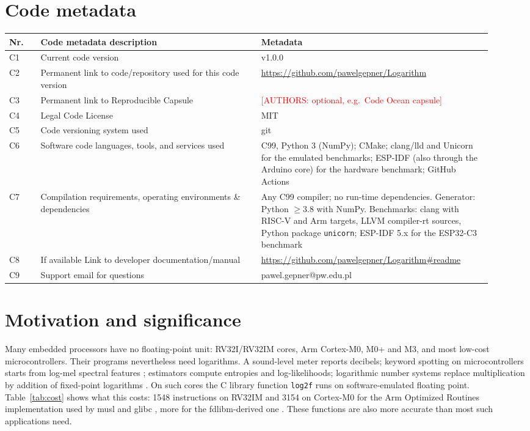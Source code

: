 \documentclass[preprint,12pt]{elsarticle}
\newcommand{\authors}[1]{\textcolor{red}{[AUTHORS: #1]}}
\begin{document}
\section*{Code metadata}
{\small
\begin{tabular}{p{0.06\linewidth}p{0.42\linewidth}p{0.44\linewidth}}
\toprule
Nr. & Code metadata description & Metadata \\
\midrule
C1 & Current code version & v1.0.0 \\
C2 & Permanent link to code/repository used for this code version & \url{https://github.com/pawelgepner/Logarithm} \\
C3 & Permanent link to Reproducible Capsule & \authors{optional, e.g.\ Code Ocean capsule} \\
C4 & Legal Code License & MIT \\
C5 & Code versioning system used & git \\
C6 & Software code languages, tools, and services used & C99, Python 3 (NumPy); CMake; clang/lld and Unicorn for the emulated benchmarks; ESP-IDF (also through the Arduino core) for the hardware benchmark; GitHub Actions \\
C7 & Compilation requirements, operating environments \& dependencies & Any C99 compiler; no run-time dependencies. Generator: Python $\ge$3.8 with NumPy. Benchmarks: clang with RISC-V and Arm targets, LLVM compiler-rt sources, Python package \texttt{unicorn}; ESP-IDF 5.x for the ESP32-C3 benchmark \\
C8 & If available Link to developer documentation/manual & \url{https://github.com/pawelgepner/Logarithm\#readme} \\
C9 & Support email for questions & pawel.gepner@pw.edu.pl \\
\bottomrule
\end{tabular}}

\section{Motivation and significance}

Many embedded processors have no floating-point unit: RV32I/RV32IM cores,
Arm Cortex-M0, M0+ and M3, and most low-cost microcontrollers. Their
programs nevertheless need logarithms. A sound-level meter reports decibels;
keyword spotting on microcontrollers starts from log-mel spectral features
\cite{zhang2017helloedge}; estimators compute entropies and log-likelihoods;
logarithmic number systems replace multiplication by addition of
fixed-point logarithms \cite{coleman2000}. On such cores the C library
function \texttt{log2f} runs on software-emulated floating point.
Table~\ref{tab:cost} shows what this costs: 1548 instructions on RV32IM and
3154 on Cortex-M0 for the Arm Optimized Routines implementation used by musl
and glibc \cite{aor}, more for the fdlibm-derived one \cite{freebsdmsun}.
These functions are also more accurate than most such applications need.
\end{document}
